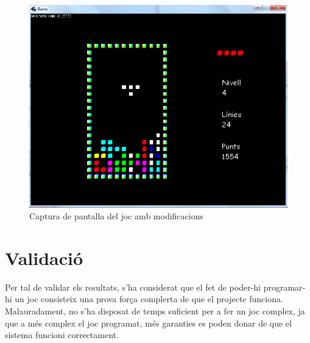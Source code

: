   \begin{figure}
    \centering
    \includegraphics[width=0.5\linewidth]{./img/ImatgePecaSeguent.png}
    \caption{Captura de pantalla del joc amb modificacions \label{fig:ImatgePecaSeguent}}
  \end{figure}
  
  
\section{Validació}

  Per tal de validar els resultats, s'ha considerat que el fet de poder-hi programar-hi un joc consisteix una prova força complerta de que el projecte funciona. Malauradament, no s'ha disposat de temps suficient per a fer un joc complex, ja que a més complex el joc programat, més garanties es poden donar de que el sistema funcioni correctament.

  